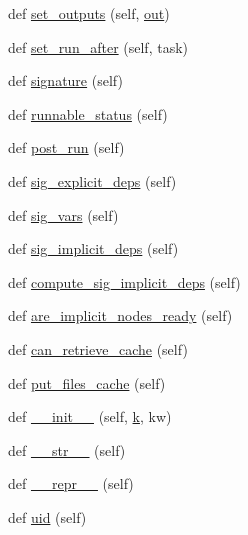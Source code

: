 \begin{DoxyCompactItemize}
\item 
def \hyperlink{classwaflib_1_1_task_1_1_task_a8e650ed64c8370720574ebd8481a4f48}{set\+\_\+outputs} (self, \hyperlink{latency_8c_a71fd1c281affec034757279e4f91c50b}{out})
\item 
def \hyperlink{classwaflib_1_1_task_1_1_task_a84292828c5a6cf3282027ed8ce5c7822}{set\+\_\+run\+\_\+after} (self, task)
\item 
def \hyperlink{classwaflib_1_1_task_1_1_task_a48e55f13de8172b779a4e63794c7f44f}{signature} (self)
\item 
def \hyperlink{classwaflib_1_1_task_1_1_task_a2a281aaea77a0732f72103cfe4bc56c4}{runnable\+\_\+status} (self)
\item 
def \hyperlink{classwaflib_1_1_task_1_1_task_ac7c2e0bf22acd7d96399b1ca7f342232}{post\+\_\+run} (self)
\item 
def \hyperlink{classwaflib_1_1_task_1_1_task_a76a53025fb59fd6096f988ff64481070}{sig\+\_\+explicit\+\_\+deps} (self)
\item 
def \hyperlink{classwaflib_1_1_task_1_1_task_acffd01af005b390787b85239ac207282}{sig\+\_\+vars} (self)
\item 
def \hyperlink{classwaflib_1_1_task_1_1_task_a60ce159ef323481b09fcea4decb9e231}{sig\+\_\+implicit\+\_\+deps} (self)
\item 
def \hyperlink{classwaflib_1_1_task_1_1_task_adf3f63ea77fbca592ebc4244ba57887d}{compute\+\_\+sig\+\_\+implicit\+\_\+deps} (self)
\item 
def \hyperlink{classwaflib_1_1_task_1_1_task_a89612661d2073f53f62d7306a6c2238d}{are\+\_\+implicit\+\_\+nodes\+\_\+ready} (self)
\item 
def \hyperlink{classwaflib_1_1_task_1_1_task_a2085cfed25d49bed519af381621b29e7}{can\+\_\+retrieve\+\_\+cache} (self)
\item 
def \hyperlink{classwaflib_1_1_task_1_1_task_adf5e108580503738b2ab58eb1b56c10f}{put\+\_\+files\+\_\+cache} (self)
\item 
def \hyperlink{classwaflib_1_1_task_1_1_task_a566ab609bec4499aeab7bcd6f77f156e}{\+\_\+\+\_\+init\+\_\+\+\_\+} (self, \hyperlink{rfft2d_test_m_l_8m_adc468c70fb574ebd07287b38d0d0676d}{k}, kw)
\item 
def \hyperlink{classwaflib_1_1_task_1_1_task_a2507ae71718d699910a9dd8708664630}{\+\_\+\+\_\+str\+\_\+\+\_\+} (self)
\item 
def \hyperlink{classwaflib_1_1_task_1_1_task_ac05a045661750df307593224089759da}{\+\_\+\+\_\+repr\+\_\+\+\_\+} (self)
\item 
def \hyperlink{classwaflib_1_1_task_1_1_task_a910c51ea67c1c47ac40690bbba73b76a}{uid} (self)

\end{DoxyCompactItemize}
